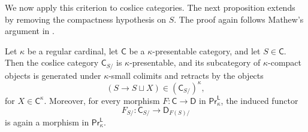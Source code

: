 We now apply this criterion to coslice categories. The next proposition extends \cite[Tags~\href{https://kerodon.net/tag/06HW}{06HW} and \href{https://kerodon.net/tag/06P6}{06P6}]{kerodon} by removing the compactness hypothesis on $S$. The proof again follows Mathew's argument in \cite[Lem.~6.22]{mathew2016galois}.

\begin{proposition}\label{lemma on coslices}
Let $\kappa$ be a regular cardinal, let $\mathsf{C}$ be a $\kappa$-presentable category, and let $S\in\mathsf{C}$. Then the coslice category $\mathsf{C}_{S/}$ is $\kappa$-presentable, and its subcategory of $\kappa$-compact objects is generated under $\kappa$-small colimits and retracts by the objects
\[(S\to S\sqcup X)\in \left(\mathsf{C}_{S/}\right)^\kappa,\]
for $X\in \mathsf{C}^\kappa$. Moreover, for every morphism $F\colon\mathsf{C}\to\mathsf{D}$ in $\mathsf{Pr}^{\mathsf{L}}_\kappa$, the induced functor
\[F_{S/}\colon \mathsf{C}_{S/}\to\mathsf{D}_{F(S)/}\]
is again a morphism in $\mathsf{Pr}^{\mathsf{L}}_\kappa$.
\end{proposition}


